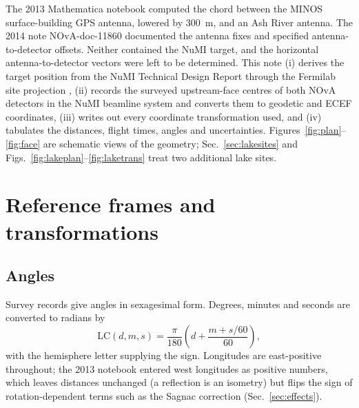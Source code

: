\documentclass[11pt,letterpaper]{article}
\begin{document}
The 2013 Mathematica notebook \cite{norman2013nb} computed the chord between the MINOS surface-building GPS antenna, lowered by \SI{300}{m}, and an Ash River antenna.  The 2014 note NOvA-doc-11860 \cite{norman2014} documented the antenna fixes and specified antenna-to-detector offsets.  Neither contained the NuMI target, and the horizontal antenna-to-detector vectors were left to be determined.  This note (i) derives the target position from the NuMI Technical Design Report \cite{numitdr1998} through the Fermilab site projection \cite{oshinowo1997}, (ii) records the surveyed upstream-face centres of both NOvA detectors \cite{bocean2026nd,bocean2026fd} in the NuMI beamline system and converts them to geodetic and ECEF coordinates, (iii) writes out every coordinate transformation used, and (iv) tabulates the distances, flight times, angles and uncertainties.  Figures~\ref{fig:plan}--\ref{fig:face} are schematic views of the geometry; Sec.~\ref{sec:lakesites} and Figs.~\ref{fig:lakeplan}--\ref{fig:laketrans} treat two additional lake sites.

\section{Reference frames and transformations}
\subsection{Angles}
Survey records give angles in sexagesimal form.  Degrees, minutes and seconds are converted to radians by
\begin{equation}
\mathrm{LC}(d,m,s)=\frac{\pi}{180}\left(d+\frac{m+s/60}{60}\right),
\end{equation}
with the hemisphere letter supplying the sign.  Longitudes are east-positive throughout; the 2013 notebook entered west longitudes as positive numbers, which leaves distances unchanged (a reflection is an isometry) but flips the sign of rotation-dependent terms such as the Sagnac correction (Sec.~\ref{sec:effects}).
\end{document}
